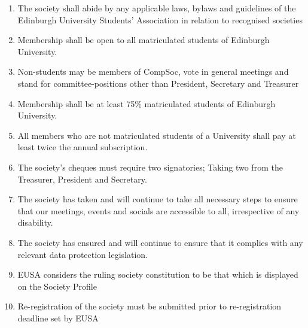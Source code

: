 \documentclass[a4paper]{article}
\begin{document}
\begin{enumerate}
  \item The society shall abide by any applicable laws, bylaws and guidelines of the Edinburgh University Students’ Association in relation to recognised societies

  \item Membership shall be open to all matriculated students of Edinburgh University.

  \item Non-students may be members of CompSoc, vote in general meetings and stand for committee-positions other than President, Secretary and Treasurer

  \item Membership shall be at least 75\% matriculated students of Edinburgh University.

  \item All members who are not matriculated students of a University shall pay at least twice the annual subscription.

  \item The society’s cheques must require two signatories; Taking two from the Treasurer, President and Secretary.

  \item The society has taken and will continue to take all necessary steps to ensure that our meetings, events and socials are accessible to all, irrespective of any disability. 

  \item The society has ensured and will continue to ensure that it complies with any relevant data protection legislation.

  \item EUSA considers the ruling society constitution to be that which is displayed on the Society Profile

  \item Re-registration of the society must be submitted prior to re-registration deadline set by EUSA


\end{enumerate}
\end{document}
